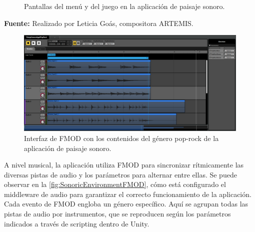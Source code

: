 \begin{figure}[h!]
	\centering
	\hfil
	\caption{Pantallas del menú y del juego en la aplicación de paisaje sonoro.}
	\label{fig:SonoricEnvironment}
\end{figure}

\begin{center}
	\textbf{Fuente:} Realizado por Leticia Goás, compositora ARTEMIS.
	\vspace{-14pt}
\end{center}

\begin{figure}[h!]
	\centering
	\includegraphics[width=0.8\linewidth]{Figuras/Desarrollo/PaisajeSonoroFMOD.png}
	\caption[Interfaz de FMOD aplicación paisaje sonoro.]{Interfaz de FMOD con los contenidos del género pop-rock de la aplicación de paisaje sonoro.}
	\label{fig:SonoricEnvironmentFMOD}
\end{figure}

A nivel musical, la aplicación utiliza FMOD para sincronizar rítmicamente las diversas pistas de audio y los parámetros para alternar entre ellas. Se puede observar en la \autoref{fig:SonoricEnvironmentFMOD}, cómo está configurado el middleware de audio para garantizar el correcto funcionamiento de la aplicación. Cada evento de FMOD engloba un género específico. Aquí se agrupan todas las pistas de audio por instrumentos, que se reproducen según los parámetros indicados a través de scripting dentro de Unity.

